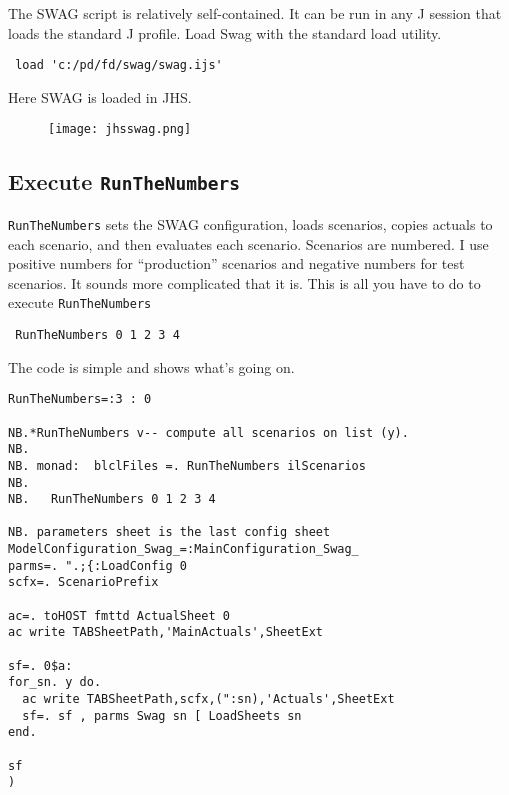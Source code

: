 The SWAG script is relatively self-contained. It can be run in any J
session that loads the standard J profile. Load Swag with the standard
load utility.

\begin{verbatim}
 load 'c:/pd/fd/swag/swag.ijs'
\end{verbatim}

\noindent Here SWAG is loaded in JHS.


\captionsetup[figure]{labelformat=empty}
\begin{figure}[htbp]
\centering
\texttt{[image: jhsswag.png]}
\label{fig:5175X0}
\end{figure}

\subsection*{Execute \texttt{RunTheNumbers}}

\texttt{RunTheNumbers} sets the SWAG configuration, loads scenarios, copies
actuals to each scenario, and then evaluates each scenario. Scenarios
are numbered. I use positive numbers for ``production'' scenarios and
negative numbers for test scenarios. It sounds more complicated that it
is. This is all you have to do to execute \texttt{RunTheNumbers}

\begin{verbatim}
 RunTheNumbers 0 1 2 3 4 
\end{verbatim}

\noindent The code is simple and shows what's going on.


\begin{lstlisting}[language=jdoc, frame=single,framerule=0pt,label=lst:scr5175X0]
RunTheNumbers=:3 : 0

NB.*RunTheNumbers v-- compute all scenarios on list (y).
NB.
NB. monad:  blclFiles =. RunTheNumbers ilScenarios
NB.
NB.   RunTheNumbers 0 1 2 3 4

NB. parameters sheet is the last config sheet
ModelConfiguration_Swag_=:MainConfiguration_Swag_
parms=. ".;{:LoadConfig 0
scfx=. ScenarioPrefix

ac=. toHOST fmttd ActualSheet 0
ac write TABSheetPath,'MainActuals',SheetExt

sf=. 0$a:
for_sn. y do.
  ac write TABSheetPath,scfx,(":sn),'Actuals',SheetExt
  sf=. sf , parms Swag sn [ LoadSheets sn
end.

sf 
)
\end{lstlisting}


